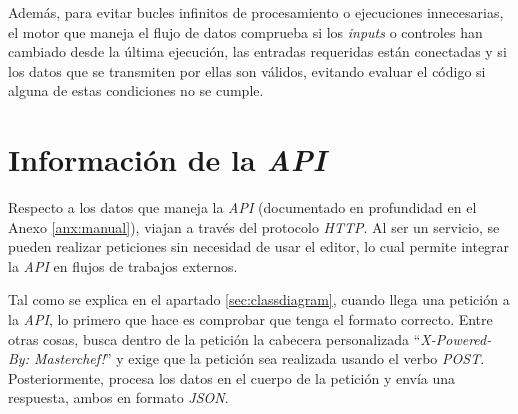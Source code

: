 Además, para evitar bucles infinitos de procesamiento o ejecuciones innecesarias, el motor que maneja el flujo de datos comprueba si los \textit{inputs} o controles han cambiado desde la última ejecución, las entradas requeridas están conectadas y si los datos que se transmiten por ellas son válidos, evitando evaluar el código si alguna de estas condiciones no se cumple.\n


\section{Información de la \textit{API}} \label{sec:apidata}

Respecto a los datos que maneja la \textit{API} (documentado en profundidad en el Anexo \ref{anx:manual}), viajan a través del protocolo \textit{HTTP}. Al ser un servicio, se pueden realizar peticiones sin necesidad de usar el editor, lo cual permite integrar la \textit{API} en flujos de trabajos externos.\sn

Tal como se explica en el apartado \ref{sec:classdiagram}, cuando llega una petición a la \textit{API}, lo primero que hace es comprobar que tenga el formato correcto. Entre otras cosas, busca dentro de la petición la cabecera personalizada ``\textit{X-Powered-By: Masterchef!}'' y exige que la petición sea realizada usando el verbo \textit{POST}. Posteriormente, procesa los datos en el cuerpo de la petición y envía una respuesta, ambos en formato \textit{JSON}.